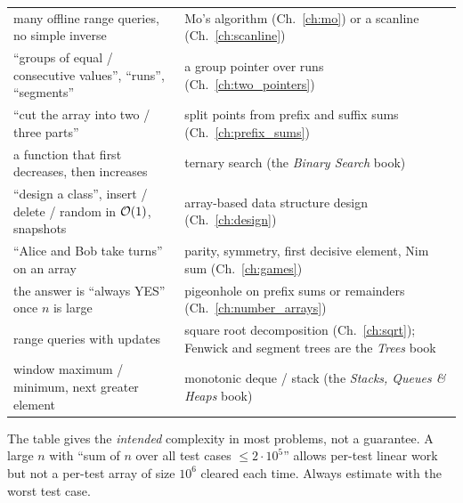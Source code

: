 \begin{tabularx}{\linewidth}{@{}>{\raggedright\arraybackslash}p{6.2cm} X@{}}
many offline range queries, no simple inverse & Mo's algorithm (Ch.~\ref{ch:mo}) or a scanline (Ch.~\ref{ch:scanline}) \\
``groups of equal / consecutive values'', ``runs'', ``segments'' & a group pointer over runs (Ch.~\ref{ch:two_pointers}) \\
``cut the array into two / three parts'' & split points from prefix and suffix sums (Ch.~\ref{ch:prefix_sums}) \\
a function that first decreases, then increases & ternary search (the \textit{Binary Search} book) \\
``design a class'', insert / delete / random in $\mathcal{O}(1)$, snapshots & array-based data structure design (Ch.~\ref{ch:design}) \\
``Alice and Bob take turns'' on an array & parity, symmetry, first decisive element, Nim sum (Ch.~\ref{ch:games}) \\
the answer is ``always YES'' once $n$ is large & pigeonhole on prefix sums or remainders (Ch.~\ref{ch:number_arrays}) \\
range queries with updates & square root decomposition (Ch.~\ref{ch:sqrt}); Fenwick and segment trees are the \textit{Trees} book \\
window maximum / minimum, next greater element & monotonic deque / stack (the \textit{Stacks, Queues \& Heaps} book) \\
\bottomrule
\end{tabularx}
\endgroup

\begin{warningbox}
The table gives the \emph{intended} complexity in most problems, not a guarantee. A large $n$ with ``sum of $n$ over all test cases $\le 2\cdot10^5$'' allows per-test linear work but not a per-test array of size $10^6$ cleared each time. Always estimate with the worst test case.
\end{warningbox}

